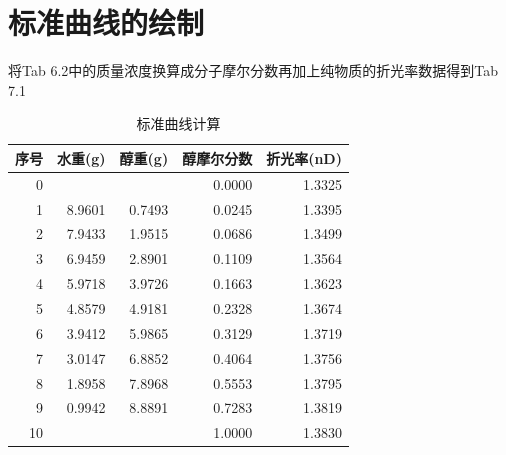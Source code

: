 \documentclass[11pt]{report}
\begin{document}
\section{标准曲线的绘制}
\label{sec:org1c55f15}
将Tab 6.2中的质量浓度换算成分子摩尔分数再加上纯物质的折光率数据得到Tab 7.1
\begin{table}[htbp]
\caption{\label{tab:org0c4b7be}标准曲线计算}
\centering
\begin{tabular}{rrrrr}
序号 & 水重(g) & 醇重(g) & 醇摩尔分数 & 折光率(nD)\\
\hline
0 &  &  & 0.0000 & 1.3325\\
1 & 8.9601 & 0.7493 & 0.0245 & 1.3395\\
2 & 7.9433 & 1.9515 & 0.0686 & 1.3499\\
3 & 6.9459 & 2.8901 & 0.1109 & 1.3564\\
4 & 5.9718 & 3.9726 & 0.1663 & 1.3623\\
5 & 4.8579 & 4.9181 & 0.2328 & 1.3674\\
6 & 3.9412 & 5.9865 & 0.3129 & 1.3719\\
7 & 3.0147 & 6.8852 & 0.4064 & 1.3756\\
8 & 1.8958 & 7.8968 & 0.5553 & 1.3795\\
9 & 0.9942 & 8.8891 & 0.7283 & 1.3819\\
10 &  &  & 1.0000 & 1.3830\\
\end{tabular}
\end{table}
\end{document}
